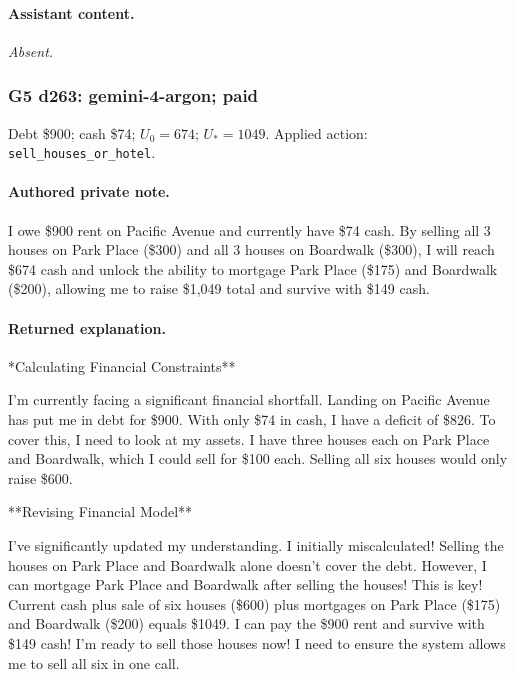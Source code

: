 \paragraph{Assistant content.}

\textit{Absent.}

\medskip

\subsubsection*{G5 d263: gemini-4-argon; paid}

Debt \$900; cash \$74; $U_0=674$; $U_*=1049$. Applied action: \texttt{sell\_houses\_or\_hotel}.

\paragraph{Authored private note.}

{\small I owe \$900 rent on Pacific Avenue and currently have \$74 cash. By selling all 3 houses on Park Place (\$300) and all 3 houses on Boardwalk (\$300), I will reach \$674 cash and unlock the ability to mortgage Park Place (\$175) and Boardwalk (\$200), allowing me to raise \$1,049 total and survive with \$149 cash.\par}

\paragraph{Returned explanation.}

{\small **Calculating Financial Constraints**
\par
I'm currently facing a significant financial shortfall. Landing on Pacific Avenue has put me in debt for \$900. With only \$74 in cash, I have a deficit of \$826. To cover this, I need to look at my assets. I have three houses each on Park Place and Boardwalk, which I could sell for \$100 each. Selling all six houses would only raise \$600.
\par

**Revising Financial Model**
\par
I've significantly updated my understanding. I initially miscalculated! Selling the houses on Park Place and Boardwalk alone doesn't cover the debt. However, I can mortgage Park Place and Boardwalk after selling the houses! This is key! Current cash plus sale of six houses (\$600) plus mortgages on Park Place (\$175) and Boardwalk (\$200) equals \$1049. I can pay the \$900 rent and survive with \$149 cash! I'm ready to sell those houses now! I need to ensure the system allows me to sell all six in one call.
\par

\par}

